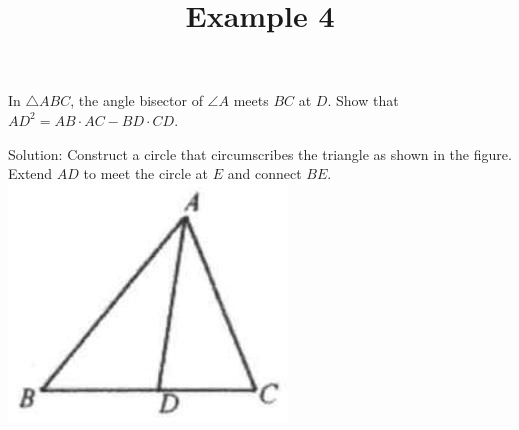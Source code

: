 \documentclass{article}
\title{Example 4}
\date{}
\begin{document}
\maketitle

In \(\triangle A B C\), the angle bisector of \(\angle A\) meets \(B C\) at \(D\). Show that \(A D^{2}=A B \cdot A C-B D \cdot C D\).

Solution:
Construct a circle that circumscribes the triangle as shown in the figure. Extend \(A D\) to meet the circle at \(E\) and connect \(B E\).\\
\centering
\includegraphics[width=\textwidth]{images/problem_image_1.jpg}
\end{document}
